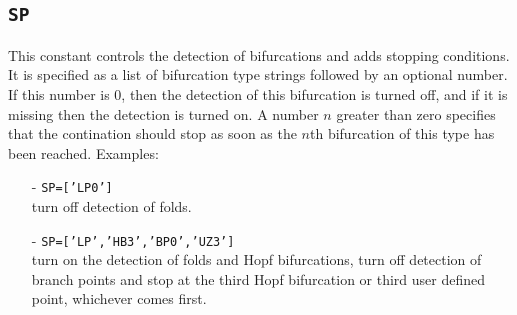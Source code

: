 \documentclass[12pt]{report}
\begin{document}
\subsection{\tt SP}  \label{sec:SP}
This constant controls the detection of bifurcations and adds stopping
conditions. It is specified as a list of bifurcation type strings
followed by an optional number. If this number is 0, then the detection
of this bifurcation is turned off, and if it is missing
then the detection is turned on. A number $n$ greater than zero
specifies that the contination should stop as soon as the $n$th
bifurcation of this type has been reached.
Examples:\\
\begin{itemize}
\item[-] {\tt SP=['LP0']}\\
turn off detection of folds.
\item[-] {\tt SP=['LP','HB3','BP0','UZ3']}\\
turn on the detection of folds and Hopf bifurcations,
turn off detection of branch points and stop at the third Hopf
bifurcation or third user defined point, whichever comes first.
\end{itemize}
 
\end{document}
